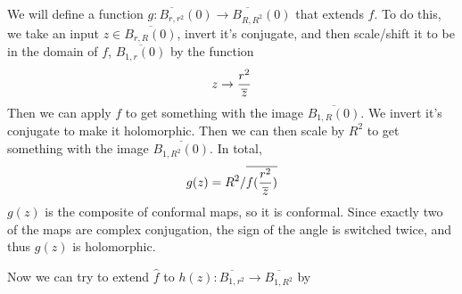 \documentclass{homework}
\begin{document}
\begin{solution}
                                                                                                                                                                            We will define a function $g:\overline{B_{r,r^2}}(0) \to \overline{B_{R, R^2}}(0)$ that extends $f$.
                                                                                                                                                                            To do this, we take an input $z\in \overline{B_{r, R}(0)}$, invert it's conjugate, and then scale/shift it to be in the domain of $f$, $\overline{B_{1,r}(0)}$ by the function 
                                                                                                                                                                            \[
                                                                                                                                                                            z \to \frac{r^2}{\overline{z}}
                                                                                                                                                                            \]
                                                                                                                                                                            Then we can apply $f$ to get something with the image $\overline{B_{1,R}(0)}$. We invert it's conjugate to make it holomorphic. Then we can then scale by $R^2$ to get something with the image $\overline{B_{1, R^2}(0)}$. In total,
                                                                                                                                                                            \[
                                                                                                                                                                            g(z) = R^2/\overline{f(\frac{r^2}{\overline{z}})}
                                                                                                                                                                            \]
                                                                                                                                                                            $g(z)$ is the composite of conformal maps, so it is conformal. Since exactly two of the maps are complex conjugation, the sign of the angle is switched twice, and thus $g(z)$ is holomorphic.

                                                                                                                                                                            Now we can try to extend $\hat{f}$ to $h(z):\overline{B_{1, r^2}} \to\overline{B_{1, R^2}}$ by


\end{solution}
\end{document}
